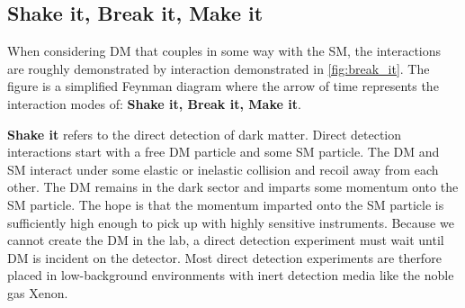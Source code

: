 \subsection{Shake it, Break it, Make it\label{sec:bop_it}}

\begin{figure}[h]
\end{figure}

When considering DM that couples in some way with the SM, the interactions are roughly demonstrated by interaction demonstrated in \cref{fig:break_it}.
The figure is a simplified Feynman diagram where the arrow of time represents the interaction modes of: \textbf{Shake it, Break it, Make it}.

\textbf{Shake it} refers to the direct detection of dark matter.
Direct detection interactions start with a free DM particle and some SM particle.
The DM and SM interact under some elastic or inelastic collision and recoil away from each other.
The DM remains in the dark sector and imparts some momentum onto the SM particle.
The hope is that the momentum imparted onto the SM particle is sufficiently high enough to pick up with highly sensitive instruments.
Because we cannot create the DM in the lab, a direct detection experiment must wait until DM is incident on the detector.
Most direct detection experiments are therfore placed in low-background environments with inert detection media like the noble gas Xenon. \cite{Cooley:dd_dm}

